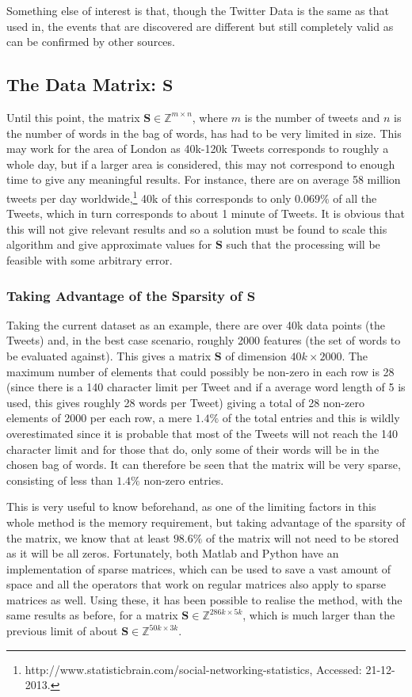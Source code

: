 \documentclass[11pt,a4paper]{article}
\newcommand{\smat}{\mathbf{S}}
\begin{document}
Something else of interest is that, though the Twitter Data is the same as that used in,\cite{microblogs} the events that are discovered are different but still completely valid as can be confirmed by other sources.

\subsection{The Data Matrix: $\smat$}
Until this point, the matrix $\mathbf{S} \in \mathbb{Z}^{m \times n}$, where $m$ is the number of tweets and $n$ is the number of words in the bag of words, has had to be very limited in size. This may work for the area of London as 40k-120k Tweets corresponds to roughly a whole day, but if a larger area is considered, this may not correspond to enough time to give any meaningful results. For instance,  there are on average 58 million tweets per day worldwide,\footnote{http://www.statisticbrain.com/social-networking-statistics, Accessed: 21-12-2013. } 40k of this corresponds to only $0.069\%$ of all the Tweets, which in turn corresponds to about 1 minute of Tweets. It is obvious that this will not give relevant results and so a solution must be found to scale this algorithm and give approximate values for $\mathbf{S}$ such that the processing will be feasible with some arbitrary error. 

\subsubsection{Taking Advantage of the Sparsity of $\mathbf{S}$}
\label{sparsity_matrix}

Taking the current dataset as an example, there are over 40k data points (the Tweets) and, in the best case scenario, roughly 2000 features (the set of words to be evaluated against). This gives a matrix $\mathbf{S}$ of dimension $40k\times 2000$. 
The maximum number of elements that could possibly be non-zero in each row is 28 (since there is a 140 character limit per Tweet and if a average word length of 5 is used, this gives roughly 28 words per Tweet) giving a total of 28 non-zero elements of 2000 per each row, a mere $1.4\%$ of the total entries and this is wildly overestimated since it is probable that most of the Tweets will not reach the 140 character limit and for those that do, only some of their words will be in the chosen bag of words. It can therefore be seen that the matrix will be very sparse, consisting of less than $1.4\%$ non-zero entries.

This is very useful to know beforehand, as one of the limiting factors in this whole method is the memory requirement, but taking advantage of the sparsity of the matrix, we know that at least $98.6\%$ of the matrix will not need to be stored as it will be all zeros. Fortunately, both Matlab and Python have an implementation of sparse matrices, which can be used to save a vast amount of space and all the operators that work on regular matrices also apply to sparse matrices as well. Using these, it has been possible to realise the method, with the same results as before, for a matrix $\mathbf{S} \in \mathbb{Z}^{286k\times5k}$, which is much larger than the previous limit of about $\mathbf{S} \in \mathbb{Z}^{50k\times3k}$.
\end{document}
